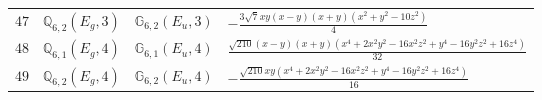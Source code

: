 \documentclass[fleqn,8pt,landscape]{jsarticle}
\begin{document}
\begin{table}[ht!]
\begin{center}
\begin{tabular}{cccl}
$ 47 $ & $ \mathbb{Q}_{6,2}(E_{g},3) $ & $ \mathbb{G}_{6,2}(E_{u},3) $ & $ - \frac{3 \sqrt{7} x y \left(x - y\right) \left(x + y\right) \left(x^{2} + y^{2} - 10 z^{2}\right)}{4} $ \\
$ 48 $ & $ \mathbb{Q}_{6,1}(E_{g},4) $ & $ \mathbb{G}_{6,1}(E_{u},4) $ & $ \frac{\sqrt{210} \left(x - y\right) \left(x + y\right) \left(x^{4} + 2 x^{2} y^{2} - 16 x^{2} z^{2} + y^{4} - 16 y^{2} z^{2} + 16 z^{4}\right)}{32} $ \\
$ 49 $ & $ \mathbb{Q}_{6,2}(E_{g},4) $ & $ \mathbb{G}_{6,2}(E_{u},4) $ & $ - \frac{\sqrt{210} x y \left(x^{4} + 2 x^{2} y^{2} - 16 x^{2} z^{2} + y^{4} - 16 y^{2} z^{2} + 16 z^{4}\right)}{16} $ \\
 \hline \hline
\end{tabular}
\end{center}
\end{table}
\end{document}
